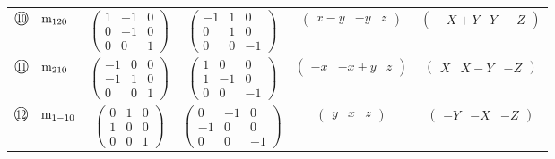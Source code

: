 \documentclass[fleqn,10pt,landscape]{jsarticle}
\begin{document}
\begin{center}
\begin{longtable}{lcccc}
$ {\ooalign{\hfil\resizebox{.8\width}{\height}{10}\hfil\crcr\raise.1ex\hbox{\large$\bigcirc$}}}\quad {\rm m}_{120} $ & $ \begin{pmatrix} 1 & -1 & 0 \\ 0 & -1 & 0 \\ 0 & 0 & 1 \end{pmatrix} $ & $ \begin{pmatrix} -1 & 1 & 0 \\ 0 & 1 & 0 \\ 0 & 0 & -1 \end{pmatrix} $ & $ \begin{pmatrix} x - y & - y & z \end{pmatrix} $ & $ \begin{pmatrix} - X + Y & Y & - Z \end{pmatrix} $ \\
$ {\ooalign{\hfil\resizebox{.8\width}{\height}{11}\hfil\crcr\raise.1ex\hbox{\large$\bigcirc$}}}\quad {\rm m}_{210} $ & $ \begin{pmatrix} -1 & 0 & 0 \\ -1 & 1 & 0 \\ 0 & 0 & 1 \end{pmatrix} $ & $ \begin{pmatrix} 1 & 0 & 0 \\ 1 & -1 & 0 \\ 0 & 0 & -1 \end{pmatrix} $ & $ \begin{pmatrix} - x & - x + y & z \end{pmatrix} $ & $ \begin{pmatrix} X & X - Y & - Z \end{pmatrix} $ \\
$ {\ooalign{\hfil\resizebox{.8\width}{\height}{12}\hfil\crcr\raise.1ex\hbox{\large$\bigcirc$}}}\quad {\rm m}_{1-10} $ & $ \begin{pmatrix} 0 & 1 & 0 \\ 1 & 0 & 0 \\ 0 & 0 & 1 \end{pmatrix} $ & $ \begin{pmatrix} 0 & -1 & 0 \\ -1 & 0 & 0 \\ 0 & 0 & -1 \end{pmatrix} $ & $ \begin{pmatrix} y & x & z \end{pmatrix} $ & $ \begin{pmatrix} - Y & - X & - Z \end{pmatrix} $ \\
\end{longtable}
\end{center}
\end{document}
